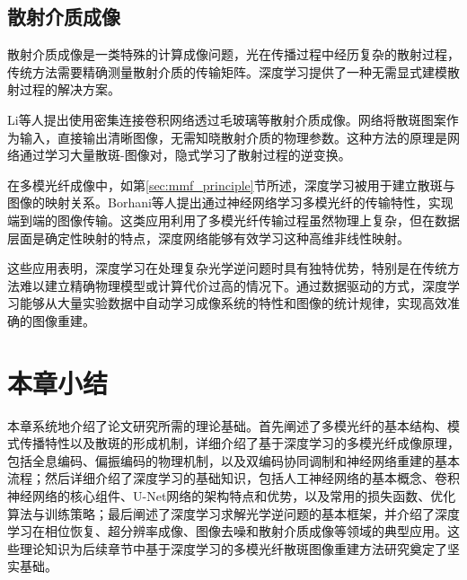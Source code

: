 {\subsection{散射介质成像}

散射介质成像是一类特殊的计算成像问题，光在传播过程中经历复杂的散射过程，传统方法需要精确测量散射介质的传输矩阵。深度学习提供了一种无需显式建模散射过程的解决方案。

Li等人\citep{li2018imaging}提出使用密集连接卷积网络透过毛玻璃等散射介质成像。网络将散斑图案作为输入，直接输出清晰图像，无需知晓散射介质的物理参数。这种方法的原理是网络通过学习大量散斑-图像对，隐式学习了散射过程的逆变换。

在多模光纤成像中，如第\ref{sec:mmf_principle}节所述，深度学习被用于建立散斑与图像的映射关系。Borhani等人\citep{borhani2018learning}提出通过神经网络学习多模光纤的传输特性，实现端到端的图像传输。这类应用利用了多模光纤传输过程虽然物理上复杂，但在数据层面是确定性映射的特点，深度网络能够有效学习这种高维非线性映射。

这些应用表明，深度学习在处理复杂光学逆问题时具有独特优势，特别是在传统方法难以建立精确物理模型或计算代价过高的情况下。通过数据驱动的方式，深度学习能够从大量实验数据中自动学习成像系统的特性和图像的统计规律，实现高效准确的图像重建。

\section{本章小结}

本章系统地介绍了论文研究所需的理论基础。首先阐述了多模光纤的基本结构、模式传播特性以及散斑的形成机制，详细介绍了基于深度学习的多模光纤成像原理，包括全息编码、偏振编码的物理机制，以及双编码协同调制和神经网络重建的基本流程；然后详细介绍了深度学习的基础知识，包括人工神经网络的基本概念、卷积神经网络的核心组件、U-Net网络的架构特点和优势，以及常用的损失函数、优化算法与训练策略；最后阐述了深度学习求解光学逆问题的基本框架，并介绍了深度学习在相位恢复、超分辨率成像、图像去噪和散射介质成像等领域的典型应用。这些理论知识为后续章节中基于深度学习的多模光纤散斑图像重建方法研究奠定了坚实基础。

}

